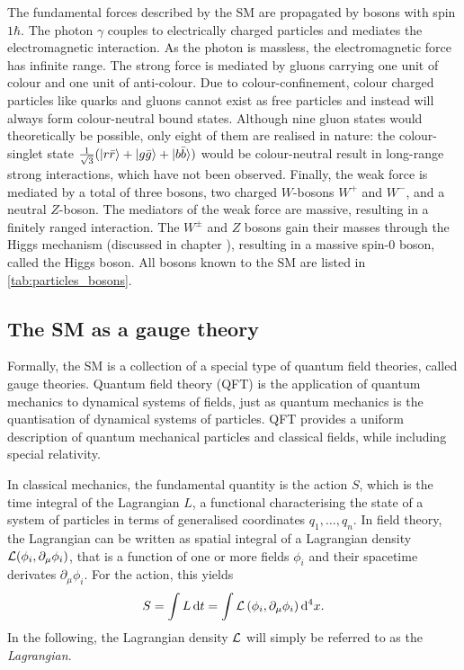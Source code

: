 The fundamental forces described by the SM are propagated by bosons with spin $1\hbar$. The photon $\gamma$ couples to electrically charged particles and mediates the electromagnetic interaction. As the photon is massless, the electromagnetic force has infinite range. The strong force is mediated by gluons carrying one unit of colour and one unit of anti-colour. Due to colour-confinement, colour charged particles like quarks and gluons cannot exist as free particles and instead will always form colour-neutral bound states. Although nine gluon states would theoretically be possible, only eight of them are realised in nature: the colour-singlet state $\frac{1}{\sqrt{3}}(\ket{r\bar{r}}+\ket{g\bar{g}}+\ket{b\bar{b}})$ would be colour-neutral result in long-range strong interactions, which have not been observed. Finally, the weak force is mediated by a total of three bosons, two charged $W$-bosons $W^+$ and $W^-$, and a neutral $Z$-boson. The mediators of the weak force are massive, resulting in a finitely ranged interaction. The $W^\pm$ and $Z$ bosons gain their masses through the Higgs mechanism (discussed in chapter ), resulting in a massive spin-0 boson, called the Higgs boson. All bosons known to the SM are listed in \cref{tab:particles_bosons}.


\subsection{The SM as a gauge theory}\label{ch:gauge_theory}


Formally, the SM is a collection of a special type of quantum field theories, called gauge theories. Quantum field theory (QFT) is the application of quantum mechanics to dynamical systems of fields, just as quantum mechanics is the quantisation of dynamical systems of particles. QFT provides a uniform description of quantum mechanical particles and classical fields, while including special relativity.

In classical mechanics, the fundamental quantity  is the action $S$, which is the time integral of the Lagrangian $L$, a functional characterising the state of a system of particles in terms of generalised coordinates $q_1, \dots, q_n$. In field theory, the Lagrangian can be written as spatial integral of a Lagrangian density $\mathcal{L}(\phi_i,\partial_\mu\phi_i)$, that is a function of one or more fields $\phi_i$ and their spacetime derivates $\partial_\mu\phi_i$. For the action, this yields
\begin{equation}
	S = \int L\mathop{}\!\mathrm{d} t = \int\mathcal{L}\left(\phi_i,\partial_\mu\phi_i\right)\mathop{}\!\mathrm{d^4} x.
\end{equation}
In the following, the Lagrangian density $\mathcal{L}$ will simply be referred to as the \textit{Lagrangian}.

